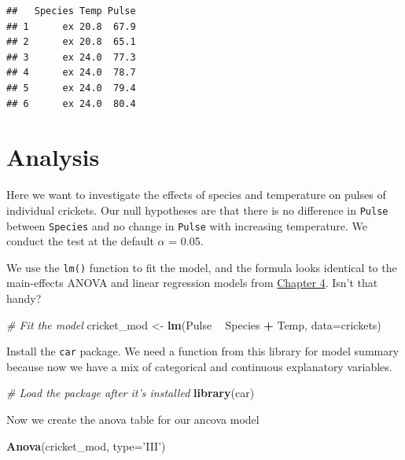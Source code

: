 \documentclass[
]{book}
\newenvironment{Shaded}{\begin{snugshade}}{\end{snugshade}}
\newcommand{\CommentTok}[1]{\textcolor[rgb]{0.56,0.35,0.01}{\textit{#1}}}
\newcommand{\DataTypeTok}[1]{\textcolor[rgb]{0.13,0.29,0.53}{#1}}
\newcommand{\KeywordTok}[1]{\textcolor[rgb]{0.13,0.29,0.53}{\textbf{#1}}}
\newcommand{\NormalTok}[1]{#1}
\newcommand{\OperatorTok}[1]{\textcolor[rgb]{0.81,0.36,0.00}{\textbf{#1}}}
\newcommand{\StringTok}[1]{\textcolor[rgb]{0.31,0.60,0.02}{#1}}
\begin{document}
\begin{verbatim}
##   Species Temp Pulse
## 1      ex 20.8  67.9
## 2      ex 20.8  65.1
## 3      ex 24.0  77.3
## 4      ex 24.0  78.7
## 5      ex 24.0  79.4
## 6      ex 24.0  80.4
\end{verbatim}

\hypertarget{analysis}{%
\section{Analysis}\label{analysis}}

Here we want to investigate the effects of species and temperature on
pulses of individual crickets. Our null hypotheses are that there is no difference in \texttt{Pulse} between \texttt{Species} and no change in \texttt{Pulse} with increasing temperature. We conduct the test at the default \(\alpha\) = 0.05.

We use the \texttt{lm()} function to fit the model, and the formula looks identical to the main-effects ANOVA and linear regression models from \protect\hyperlink{Chapter4}{Chapter 4}. Isn't that handy?

\begin{Shaded}
\begin{Highlighting}[]
\CommentTok{# Fit the model}
\NormalTok{cricket_mod <-}\StringTok{ }\KeywordTok{lm}\NormalTok{(Pulse }\OperatorTok{~}\StringTok{ }\NormalTok{Species }\OperatorTok{+}\StringTok{ }\NormalTok{Temp, }\DataTypeTok{data=}\NormalTok{crickets)}
\end{Highlighting}
\end{Shaded}

Install the \texttt{car} package. We need a function from this library for model summary because now we have a mix of categorical and continuous explanatory variables.

\begin{Shaded}
\begin{Highlighting}[]
\CommentTok{# Load the package after it's installed}
\KeywordTok{library}\NormalTok{(car)}
\end{Highlighting}
\end{Shaded}

Now we create the anova table for our ancova model

\begin{Shaded}
\begin{Highlighting}[]
\KeywordTok{Anova}\NormalTok{(cricket_mod, }\DataTypeTok{type=}\StringTok{'III'}\NormalTok{)}
\end{Highlighting}
\end{Shaded}
\end{document}
